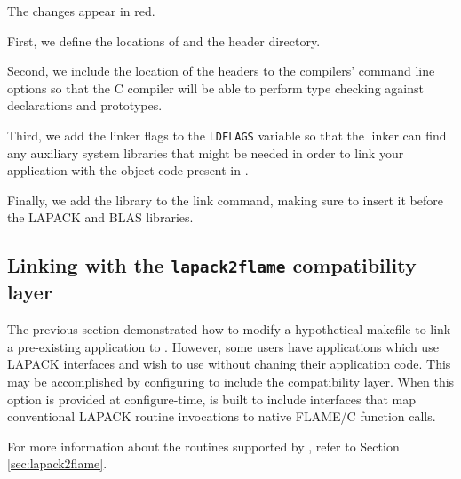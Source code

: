 \noindent
The changes appear in red.

First, we define the locations of \libflame and the \libflame header directory.

Second, we include the location of the \libflame headers to the compilers'
command line options so that the C compiler will be able to perform type
checking against \libflame declarations and prototypes.

Third, we add the linker flags to the {\tt LDFLAGS} variable so that the
linker can find any auxiliary system libraries that might be needed in
order to link your application with the object code present in \libflamens.

Finally, we add the \libflame library to the link command, making sure to
insert it before the LAPACK and BLAS libraries.



\subsection{Linking with the {\tt lapack2flame} compatibility layer}


The previous section demonstrated how to modify a hypothetical makefile
to link a pre-existing application to \libflamens.
However, some users have applications which use LAPACK interfaces and
wish to use \libflame without chaning their application code.
This may be accomplished by configuring \libflame to include the
\lapacktflame compatibility layer.
When this option is provided at configure-time, \libflame is built
to include interfaces that map conventional LAPACK routine invocations to
native FLAME/C function calls.

For more information about the routines supported by \lapacktflame, refer
to Section \ref{sec:lapack2flame}.



